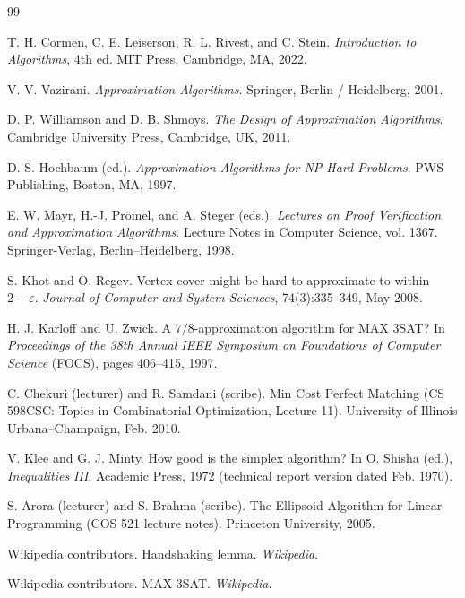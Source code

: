 \documentclass{article}
\begin{document}
\newpage
\begingroup
\begin{thebibliography}{99}

T. H. Cormen, C. E. Leiserson, R. L. Rivest, and C. Stein.
\emph{Introduction to Algorithms}, 4th ed.
MIT Press, Cambridge, MA, 2022.

V. V. Vazirani.
\emph{Approximation Algorithms}.
Springer, Berlin / Heidelberg, 2001.

D. P. Williamson and D. B. Shmoys.
\emph{The Design of Approximation Algorithms}.
Cambridge University Press, Cambridge, UK, 2011.

D. S. Hochbaum (ed.). \emph{Approximation Algorithms for NP-Hard Problems}.
PWS Publishing, Boston, MA, 1997.

E. W. Mayr, H.-J. Pr\"omel, and A. Steger (eds.).
\newblock \emph{Lectures on Proof Verification and Approximation Algorithms}.
\newblock Lecture Notes in Computer Science, vol. 1367. Springer-Verlag,
Berlin--Heidelberg, 1998.


S. Khot and O. Regev.
Vertex cover might be hard to approximate to within $2-\varepsilon$.
\emph{Journal of Computer and System Sciences}, 74(3):335--349, May 2008.

H. J. Karloff and U. Zwick.
A $7/8$-approximation algorithm for MAX 3SAT?
In \emph{Proceedings of the 38th Annual IEEE Symposium on Foundations of Computer Science}
(FOCS), pages 406--415, 1997.

C. Chekuri (lecturer) and R. Samdani (scribe). Min Cost Perfect Matching (CS 598CSC: Topics in Combinatorial Optimization, Lecture 11). University of Illinois Urbana--Champaign, Feb. 2010.

V. Klee and G. J. Minty.
How good is the simplex algorithm?
In O. Shisha (ed.), \emph{Inequalities III}, Academic Press, 1972
(technical report version dated Feb. 1970).

S. Arora (lecturer) and S. Brahma (scribe). The Ellipsoid Algorithm for Linear Programming (COS 521 lecture notes). Princeton University, 2005.

Wikipedia contributors. Handshaking lemma. \emph{Wikipedia}.

Wikipedia contributors. MAX-3SAT. \emph{Wikipedia}. 

\end{thebibliography}
\endgroup
\end{document}
